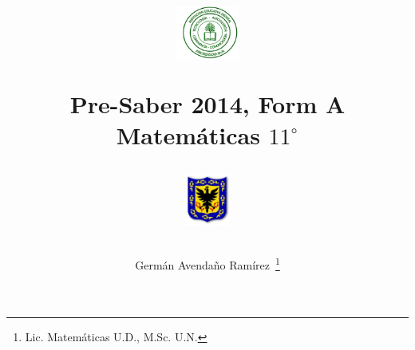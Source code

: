 \documentclass[10pt,addpoints]{exam}
\begin{document}
\title{\begin{minipage}{.2\textwidth}
        \includegraphics[height=1.75cm]{Images/logo-colegio.png}
       \end{minipage}
\begin{minipage}{.55\textwidth}
 \begin{center}
Pre-Saber 2014, Form A\\Matemáticas $11^{\circ}$
\end{center}
\end{minipage}
\begin{minipage}{.2\textwidth}
\includegraphics[height=1.75cm]{Images/logo-sed.png} 
\end{minipage}
}
\author{Germ\'{a}n Avendaño Ram\'{i}rez~\thanks{Lic. Matemáticas U.D., M.Sc. U.N.}}
\date{}
\maketitle
\begin{center}
\end{center}
\end{document}
